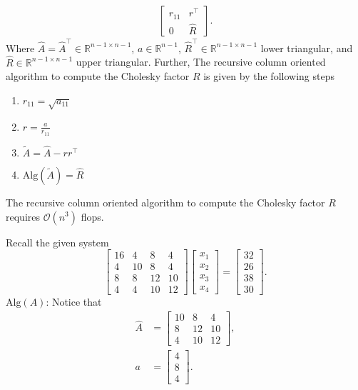 \documentclass{report}
\begin{document}
\begin{remark}
\begin{align*}
            \begin{bmatrix}
                r_{11} & r^{\top} \\
                0 & \hat{R}
            \end{bmatrix}
        .\end{align*}
        Where $\hat{A} = \hat{A}^{\top} \in \mathbb{R}^{n-1 \times n-1}$, $a \in \mathbb{R}^{n-1}$, $\hat{R}^{\top} \in \mathbb{R}^{n-1\times n-1}$ lower triangular, and $\hat{R} \in \mathbb{R}^{n-1\times n-1}$ upper triangular. Further,
        \bigbreak \noindent 
        The recursive column oriented algorithm to compute the Cholesky factor $R$ is given by the following steps
        \begin{enumerate}
            \item $r_{11} = \sqrt{a_{11}}$
            \item $r = \frac{a}{r_{11}} $
            \item $\tilde{A} = \hat{A} - rr^{\top} $
            \item $\text{Alg}(\tilde{A}) = \hat{R} $
        \end{enumerate}
        \bigbreak \noindent 
        The recursive column oriented algorithm to compute the Cholesky factor $R$ requires $\mathcal{O}(n^{3})$ flops.
    \end{remark}
    \bigbreak \noindent 
    Recall the given system 
    \[
        \begin{bmatrix}
            16 & 4 & 8 & 4 \\
            4 & 10 & 8 & 4 \\
            8 & 8 & 12 & 10 \\
            4 & 4 & 10 & 12
        \end{bmatrix}
        \begin{bmatrix}
            x_{1} \\ x_{2} \\ x_{3} \\ x_{4}
        \end{bmatrix}
        =
        \begin{bmatrix}
            32 \\
            26 \\
            38 \\
            30
        \end{bmatrix}.
    \]
    $\text{Alg}(A)$: Notice that 
    \begin{align*}
        \hat{A} &= \begin{bmatrix} 10 & 8 & 4 \\ 8 & 12 & 10 \\ 4 & 10 & 12 \end{bmatrix}, \\
        a &= \begin{bmatrix} 4 \\ 8 \\ 4 \end{bmatrix}.
    \end{align*}
\end{document}

